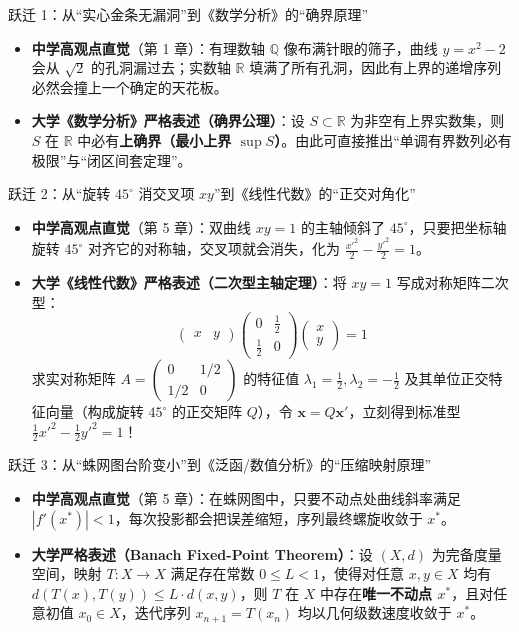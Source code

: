 \begin{methodbox}{跃迁 1：从“实心金条无漏洞”到《数学分析》的“确界原理”}
\begin{itemize}
    \item \textbf{中学高观点直觉}（第 1 章）：有理数轴 $\mathbb{Q}$ 像布满针眼的筛子，曲线 $y=x^2-2$ 会从 $\sqrt{2}$ 的孔洞漏过去；实数轴 $\mathbb{R}$ 填满了所有孔洞，因此有上界的递增序列必然会撞上一个确定的天花板。
    \item \textbf{大学《数学分析》严格表述（确界公理）}：设 $S \subset \mathbb{R}$ 为非空有上界实数集，则 $S$ 在 $\mathbb{R}$ 中必有\textbf{上确界（最小上界 $\sup S$）}。由此可直接推出“单调有界数列必有极限”与“闭区间套定理”。
\end{itemize}
\end{methodbox}

\begin{methodbox}{跃迁 2：从“旋转 $45^\circ$ 消交叉项 $xy$”到《线性代数》的“正交对角化”}
\begin{itemize}
    \item \textbf{中学高观点直觉}（第 5 章）：双曲线 $xy = 1$ 的主轴倾斜了 $45^\circ$，只要把坐标轴旋转 $45^\circ$ 对齐它的对称轴，交叉项就会消失，化为 $\frac{x'^2}{2} - \frac{y'^2}{2} = 1$。
    \item \textbf{大学《线性代数》严格表述（二次型主轴定理）}：将 $xy = 1$ 写成对称矩阵二次型：
    $$\begin{pmatrix} x & y \end{pmatrix} \begin{pmatrix} 0 & \frac{1}{2} \\ \frac{1}{2} & 0 \end{pmatrix} \begin{pmatrix} x \\ y \end{pmatrix} = 1$$
    求实对称矩阵 $A = \begin{pmatrix} 0 & 1/2 \\ 1/2 & 0 \end{pmatrix}$ 的特征值 $\lambda_1 = \frac{1}{2}, \lambda_2 = -\frac{1}{2}$ 及其单位正交特征向量（构成旋转 $45^\circ$ 的正交矩阵 $Q$），令 $\mathbf{x} = Q\mathbf{x}'$，立刻得到标准型 $\frac{1}{2}x'^2 - \frac{1}{2}y'^2 = 1$！
\end{itemize}
\end{methodbox}

\begin{methodbox}{跃迁 3：从“蛛网图台阶变小”到《泛函/数值分析》的“压缩映射原理”}
\begin{itemize}
    \item \textbf{中学高观点直觉}（第 5 章）：在蛛网图中，只要不动点处曲线斜率满足 $|f'(x^*)| < 1$，每次投影都会把误差缩短，序列最终螺旋收敛于 $x^*$。
    \item \textbf{大学严格表述（Banach Fixed-Point Theorem）}：设 $(X, d)$ 为完备度量空间，映射 $T: X \to X$ 满足存在常数 $0 \le L < 1$，使得对任意 $x, y \in X$ 均有 $d(T(x), T(y)) \le L \cdot d(x, y)$，则 $T$ 在 $X$ 中存在\textbf{唯一不动点 $x^*$}，且对任意初值 $x_0 \in X$，迭代序列 $x_{n+1} = T(x_n)$ 均以几何级数速度收敛于 $x^*$。
\end{itemize}
\end{methodbox}

